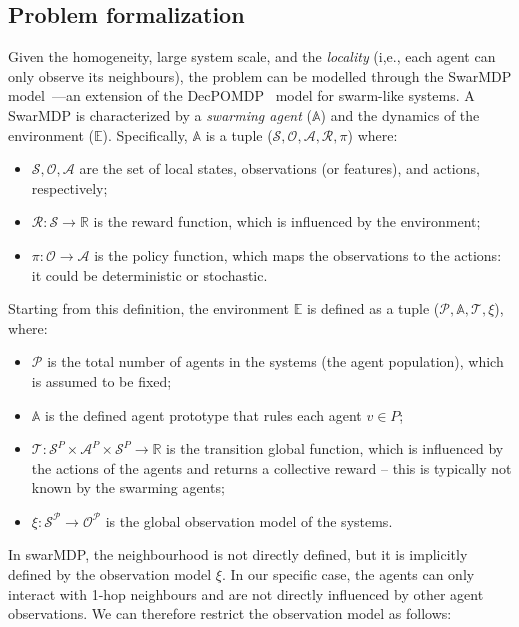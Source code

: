 \subsection{Problem formalization}
Given the homogeneity, large system scale, and the \emph{locality} (i,e., each agent can only observe its neighbours), 
 the problem can be modelled through the SwarMDP model~\cite{DBLP:conf/atal/SosicKZK17}---an extension of the \ac{DecPOMDP}~\cite{Decpomdp2000} model for swarm-like systems.
% 
A SwarMDP is characterized by a \emph{swarming agent} ($\mathbb{A}$) and the dynamics of the environment ($\mathbb{E}$).
Specifically, $\mathbb{A}$ is a tuple ($\mathcal{S}, \mathcal{O}, \mathcal{A}, \mathcal{R}, \pi$) where:
\begin{itemize}
  \item $\mathcal{S, O, A}$ are the set of local states, observations (or features), and actions, respectively;
  \item $\mathcal{R}: \mathcal{S} \rightarrow \mathbb{R}$ is the reward function, which is influenced by the environment;
  \item $\pi: \mathcal{O} \rightarrow \mathcal{A}$ is the policy function, which maps the observations to the actions: it could be deterministic or stochastic.
\end{itemize}
Starting from this definition, the environment $\mathbb{E}$ is defined as a tuple ($\mathcal{P}, \mathbb{A}, \mathcal{T}, \xi$), where:
\begin{itemize}
  \item $\mathcal{P}$ is the total number of agents in the systems (the agent population), which is assumed to be fixed;
  \item $\mathbb{A}$ is the defined agent prototype that rules each agent $v \in P$;
  \item $\mathcal{T}: \mathcal{S}^P \times \mathcal{A}^P \times \mathcal{S}^P \rightarrow \mathbb{R}$ is the transition  global function, which is influenced by the actions of the agents and returns a collective reward -- this is typically not known by the swarming agents;
  \item $\xi: \mathcal{S^P} \rightarrow \mathcal{O^P}$ is the global observation model of the systems.
\end{itemize}
In swarMDP, the neighbourhood is not directly defined, but it is implicitly defined by the observation model $\xi$.
In our specific case, the agents can only interact with 1-hop neighbours and are not directly influenced by other agent observations. We can therefore restrict the observation model as follows:
